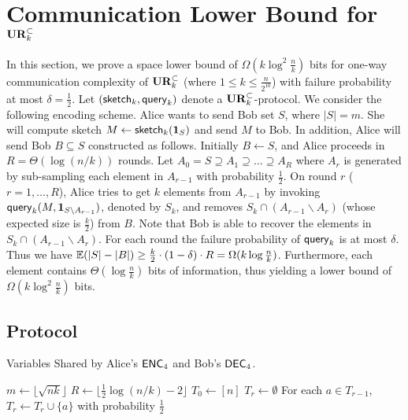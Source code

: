 \section{Communication Lower Bound for $\mathbf{UR}_k^\subset$}\label{sec:k-samples-lb}

In this section, we prove a space lower bound of $\Omega(k\log^2
\frac{n}{k})$ bits for one-way communication complexity of $\mathbf{UR}_k^\subset$ (where $1\le k \le \frac{n}{2^{10}}$) with failure probability at most $\delta = \frac{1}{2}$.
Let $(\mathsf{sketch}_k, \mathsf{query}_k)$ denote a $\mathbf{UR}_k^\subset$-protocol. 
We consider the following encoding scheme. 
Alice wants to send Bob set $S$, where $|S|=m$. 
She will compute sketch $M\leftarrow \mathsf{sketch}_k(\mathbf{1}_S)$ and send $M$ to Bob. 
In addition, Alice will send Bob $B\subseteq S$ constructed as follows.
Initially $B\leftarrow S$, and Alice proceeds in $R=\Theta(\log (n/k))$ rounds. 
Let $A_0=S\supseteq A_1\supseteq \ldots \supseteq A_R$ where $A_r$ is generated by sub-sampling each element in $A_{r-1}$ with probability $\frac{1}{2}$. 
On round $r$ ($r=1,\ldots, R$), Alice tries to get $k$ elements from $A_{r-1}$ by invoking $\mathsf{query}_k(M, \mathbf{1}_{S\backslash A_{r-1}})$, denoted by $S_k$, and removes $S_k\cap (A_{r-1}\backslash A_{r})$ (whose expected size is $\frac{k}{2}$) from $B$. 
Note that Bob is able to recover the elements in $S_k\cap (A_{r-1}\backslash A_{r})$. 
For each round the failure probability of $\mathsf{query}_k$ is at most $\delta$. 
Thus we have $\operatorname*{\mathbb{E}}(|S|-|B|)\ge \frac{k}{2}\cdot (1-\delta) \cdot R=\Omega(k\log\frac{n}{k})$. 
Furthermore, each element contains $\Theta(\log \frac{n}{k})$ bits of information, thus yielding a lower bound of $\Omega(k\log^2\frac{n}{k})$ bits.

\subsection{Protocol}
\begin{algorithm}[H] 
  \caption{Variables Shared by Alice's $\textsf{ENC}_4$ and Bob's $\textsf{DEC}_4$.} \label{algo:para4}
  \begin{algorithmic}[1] 
    \State $m\leftarrow \lfloor \sqrt{nk} \rfloor$
    \State $R\leftarrow \lfloor \frac{1}{2}\log (n/k) - 2 \rfloor$ 
    \State $T_0\leftarrow [n]$
      \State $T_r\leftarrow \emptyset$
      \State For each $a\in T_{r-1}$, $T_r\leftarrow T_r\cup \{a\}$ with probability $\frac{1}{2}$ 
    \EndFor
  \end{algorithmic}
\end{algorithm}

